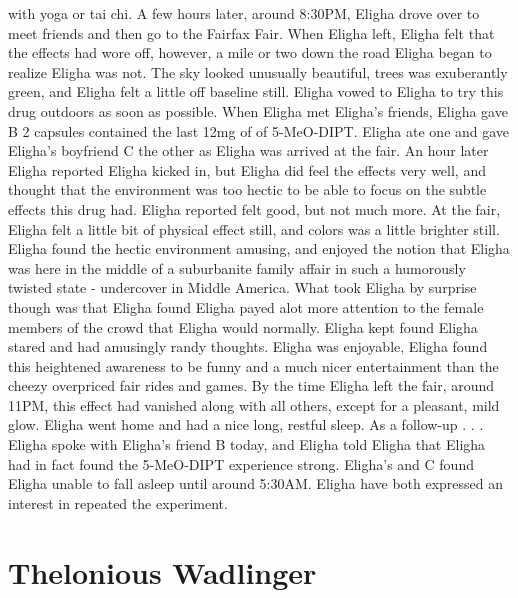 \documentclass[12pt]{book}
\begin{document}
with yoga or tai chi. A few hours later, around 8:30PM, Eligha drove over to meet friends and then go to the Fairfax Fair. When Eligha left, Eligha felt that the effects had wore off, however, a mile or two down the road Eligha began to realize Eligha was not. The sky looked unusually beautiful, trees was exuberantly green, and Eligha felt a little off baseline still. Eligha vowed to Eligha to try this drug outdoors as soon as possible. When Eligha met Eligha's friends, Eligha gave B 2 capsules contained the last 12mg of of 5-MeO-DIPT. Eligha ate one and gave Eligha's boyfriend C the other as Eligha was arrived at the fair. An hour later Eligha reported Eligha kicked in, but Eligha did feel the effects very well, and thought that the environment was too hectic to be able to focus on the subtle effects this drug had. Eligha reported felt good, but not much more. At the fair, Eligha felt a little bit of physical effect still, and colors was a little brighter still. Eligha found the hectic environment amusing, and enjoyed the notion that Eligha was here in the middle of a suburbanite family affair in such a humorously twisted state - undercover in Middle America. What took Eligha by surprise though was that Eligha found Eligha payed alot more attention to the female members of the crowd that Eligha would normally. Eligha kept found Eligha stared and had amusingly randy thoughts. Eligha was enjoyable, Eligha found this heightened awareness to be funny and a much nicer entertainment than the cheezy overpriced fair rides and games. By the time Eligha left the fair, around 11PM, this effect had vanished along with all others, except for a pleasant, mild glow. Eligha went home and had a nice long, restful sleep. As a follow-up . . .  Eligha spoke with Eligha's friend B today, and Eligha told Eligha that Eligha had in fact found the 5-MeO-DIPT experience strong. Eligha's and C found Eligha unable to fall asleep until around 5:30AM. Eligha have both expressed an interest in repeated the experiment.



\chapter{Thelonious Wadlinger}
\end{document}
